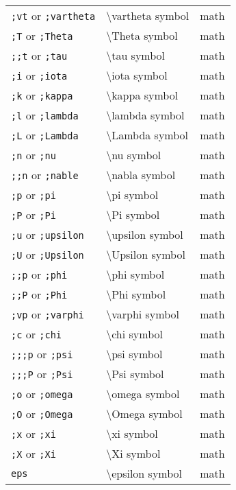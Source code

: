 \documentclass{article}
\begin{document}
\begin{longtable}{|p{}|p{}|p{}|}
\texttt{;vt} or \texttt{;vartheta} & \textbackslash vartheta symbol & math \\
\texttt{;T} or \texttt{;Theta} & \textbackslash Theta symbol & math \\
\texttt{;;t} or \texttt{;tau} & \textbackslash tau symbol & math \\
\texttt{;i} or \texttt{;iota} & \textbackslash iota symbol & math \\
\texttt{;k} or \texttt{;kappa} & \textbackslash kappa symbol & math \\
\texttt{;l} or \texttt{;lambda} & \textbackslash lambda symbol & math \\
\texttt{;L} or \texttt{;Lambda} & \textbackslash Lambda symbol & math \\
\texttt{;n} or \texttt{;nu} & \textbackslash nu symbol & math \\
\texttt{;;n} or \texttt{;nable} & \textbackslash nabla symbol & math \\
\texttt{;p} or \texttt{;pi} & \textbackslash pi symbol & math \\
\texttt{;P} or \texttt{;Pi} & \textbackslash Pi symbol & math \\
\texttt{;u} or \texttt{;upsilon} & \textbackslash upsilon symbol & math \\
\texttt{;U} or \texttt{;Upsilon} & \textbackslash Upsilon symbol & math \\
\texttt{;;p} or \texttt{;phi} & \textbackslash phi symbol & math \\
\texttt{;;P} or \texttt{;Phi} & \textbackslash Phi symbol & math \\
\texttt{;vp} or \texttt{;varphi} & \textbackslash varphi symbol & math \\
\texttt{;c} or \texttt{;chi} & \textbackslash chi symbol & math \\
\texttt{;;;p} or \texttt{;psi} & \textbackslash psi symbol & math \\
\texttt{;;;P} or \texttt{;Psi} & \textbackslash Psi symbol & math \\
\texttt{;o} or \texttt{;omega} & \textbackslash omega symbol & math \\
\texttt{;O} or \texttt{;Omega} & \textbackslash Omega symbol & math \\
\texttt{;x} or \texttt{;xi} & \textbackslash xi symbol & math \\
\texttt{;X} or \texttt{;Xi} & \textbackslash Xi symbol & math \\
\texttt{eps} & \textbackslash epsilon symbol & math \\

\end{longtable}
\end{document}
